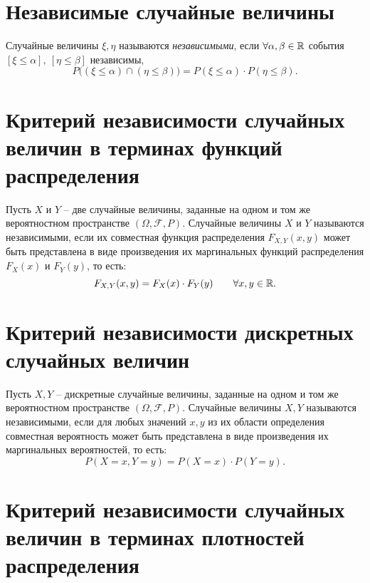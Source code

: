 \section{Независимые случайные величины}

\begin{definition}
	Случайные величины $\xi , \eta$ называются \emph{независимыми}, если $\forall \alpha ,\beta \in \mathbb{R}$ события $[\xi \leqslant \alpha ], \ [\eta \leqslant \beta ]$ независимы,
	\[
		P \big((\xi \leqslant \alpha ) \cap (\eta \leqslant \beta )\big) = P(\xi \leqslant \alpha ) \cdot P(\eta \leqslant \beta ).
	\]
\end{definition}

\newpage

\section{Критерий независимости случайных величин в терминах функций распределения}

\begin{theorem}
	Пусть $X$ и $Y$ -- две случайные величины, заданные на одном и том же вероятностном пространстве $(\Omega ,\mathcal{F},P)$. Случайные величины $X$ и $Y$ называются независимыми, если их совместная функция распределения $F_{X,Y} (x,y)$ может быть представлена в виде произведения их маргинальных функций распределения $F_X(x)$ и $F_Y(y)$, то есть:
	\[
		F_{X,Y} (x,y) = F_X(x) \cdot F_Y (y) \qquad \forall x,y \in \mathbb{R}.
	\]
\end{theorem}

\section{Критерий независимости дискретных случайных величин}

\begin{theorem}
	Пусть $X,Y$ -- дискретные случайные величины, заданные на одном и том же вероятностном пространстве $(\Omega ,\mathcal{F},P)$. Случайные величины $X,Y$ называются независимыми, если для любых значений $x,y$ из их области определения совместная вероятность может быть представлена в виде произведения их маргинальных вероятностей, то есть:
	\[
		P(X=x,Y=y) = P(X=x) \cdot P(Y=y).
	\]
\end{theorem}

\section{Критерий независимости случайных величин в терминах плотностей распределения}


